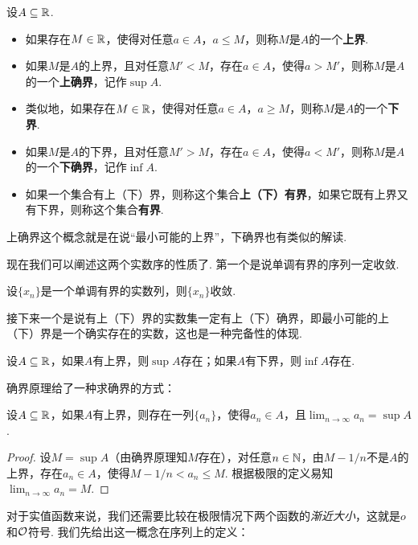 \begin{definition}
    设$A\subseteq\mathbb{R}$. 
\begin{itemize}
    \item 如果存在$M\in\mathbb{R}$，使得对任意$a\in A$，$a\leq M$，则称$M$是$A$的一个\textbf{上界}. 
    \item 如果$M$是$A$的上界，且对任意$M'<M$，存在$a\in A$，使得$a>M'$，则称$M$是$A$的一个\textbf{上确界}，记作$\sup A$. 
    \item  类似地，如果存在$M\in\mathbb{R}$，使得对任意$a\in A$，$a\geq M$，则称$M$是$A$的一个\textbf{下界}. 
    \item 如果$M$是$A$的下界，且对任意$M'>M$，存在$a\in A$，使得$a<M'$，则称$M$是$A$的一个\textbf{下确界}，记作$\inf A$. 
    \item     如果一个集合有上（下）界，则称这个集合\textbf{上（下）有界}，如果它既有上界又有下界，则称这个集合\textbf{有界}. 
\end{itemize}    
\end{definition}

上确界这个概念就是在说“最小可能的上界”，下确界也有类似的解读. 

现在我们可以阐述这两个实数序的性质了. 第一个是说单调有界的序列一定收敛. 

\begin{proposition}[单调有界原理]\label{proposition:monotone-bounded}
    设$\{x_n\}$是一个单调有界的实数列，则$\{x_n\}$收敛. 
\end{proposition}

接下来一个是说有上（下）界的实数集一定有上（下）确界，即最小可能的上（下）界是一个确实存在的实数，这也是一种完备性的体现. 
\begin{proposition}[确界原理]\label{proposition:supremum}
    设$A\subseteq\mathbb{R}$，如果$A$有上界，则$\sup A$存在；如果$A$有下界，则$\inf A$存在. 
\end{proposition}

确界原理给了一种求确界的方式：
\begin{proposition}\label{proposition:supremum-epsilon}
    设$A\subseteq\mathbb{R}$，如果$A$有上界，则存在一列$\{a_n\}$，使得$a_n\in A$，且$\lim_{n\to\infty}a_n=\sup A$.
\end{proposition}
\begin{proof}
    设$M=\sup A$（由确界原理知$M$存在），对任意$n\in\mathbb{N}$，由$M-1/n$不是$A$的上界，存在$a_n\in A$，使得$M-1/n<a_n\leq M$. 根据极限的定义易知$\lim_{n\to\infty}a_n=M$.
\end{proof}

对于实值函数来说，我们还需要比较在极限情况下两个函数的\textit{渐近大小}，这就是$o$和$\mathcal{O}$符号. 我们先给出这一概念在序列上的定义：

